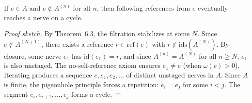 \begin{theorem}
If $e \in A$ and $e \notin A^{(n)}$ for all $n$, then following references from $e$ eventually reaches a nerve on a cycle.
\end{theorem}

\begin{proof}[Proof sketch]
By Theorem~6.3, the filtration stabilizes at some $N$.  Since $e \notin A^{(N+1)}$, there exists a reference $r \in \mathrm{ref}(e)$ with $r \notin \mathrm{ids}(A^{(N)})$.  By closure, some nerve $e_1$ has $\mathrm{id}(e_1) = r$, and since $A^{(n)} = A^{(N)}$ for all $n \geq N$, $e_1$ is also unstaged.  The no-self-reference axiom ensures $e_1 \neq e$ (when $\omega(e) > 0$).  Iterating produces a sequence $e, e_1, e_2, \ldots$ of distinct unstaged nerves in $A$.  Since $A$ is finite, the pigeonhole principle forces a repetition: $e_i = e_j$ for some $i < j$.  The segment $e_i, e_{i+1}, \ldots, e_j$ forms a cycle.
\end{proof}

